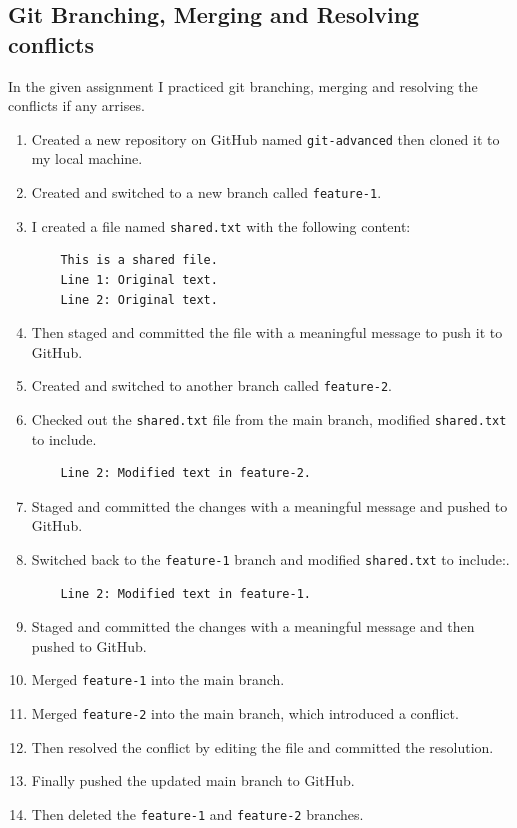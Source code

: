 \documentclass[a4paper,12pt]{article}
\begin{document}
\subsection{Git Branching, Merging and Resolving conflicts}
In the given assignment I practiced git branching, merging and resolving the conflicts if any arrises.
\begin{enumerate}
    \item Created a new repository on GitHub named \texttt{git-advanced} then cloned it to my local machine.
    \item Created and switched to a new branch called \texttt{feature-1}.
    \item I created a file named \texttt{shared.txt} with the following content:
    \begin{verbatim}
    This is a shared file.
    Line 1: Original text.
    Line 2: Original text.
    \end{verbatim}
    \item Then staged and committed the file with a meaningful message to push it to GitHub.
    \item Created and switched to another branch called \texttt{feature-2}.
    \item Checked out the \texttt{shared.txt} file from the main branch, modified \texttt{shared.txt} to include.
    \begin{verbatim}
    Line 2: Modified text in feature-2.
    \end{verbatim}
    \item Staged and committed the changes with a meaningful message and pushed to GitHub.
    \item Switched back to the \texttt{feature-1} branch and modified \texttt{shared.txt} to include:.
    \begin{verbatim}
    Line 2: Modified text in feature-1.
    \end{verbatim}
    \item Staged and committed the changes with a meaningful message and then pushed to GitHub.
    \item Merged \texttt{feature-1} into the main branch.
    \item Merged \texttt{feature-2} into the main branch, which introduced a conflict.
    \item Then resolved the conflict by editing the file and committed the resolution.
    \item Finally pushed the updated main branch to GitHub.
    \item Then deleted the \texttt{feature-1} and \texttt{feature-2} branches.
\end{enumerate}
\end{document}
